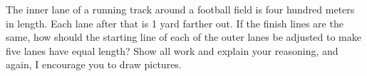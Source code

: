 \documentclass[noauthor,hints,nooutcomes,handout]{ximera}
\begin{document}
\begin{question}
\end{question}

\mynewpage


\begin{question}
  The inner lane of a running track around a football field is four
  hundred meters in length.  Each lane after that is 1 yard farther
  out.  If the finish lines are the same, how should the starting line
  of each of the outer lanes be adjusted to make five lanes have equal
  length? Show all work and explain your reasoning, and again, I
  encourage you to draw pictures.
\end{question}
\end{document}
